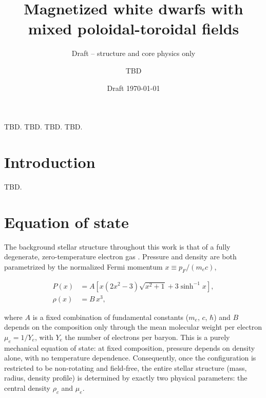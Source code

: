 \documentclass{aa}
\begin{document}
   \title{Magnetized white dwarfs with mixed poloidal-toroidal fields}

   \subtitle{Draft -- structure and core physics only}

   \author{TBD
          }


   \date{Draft \today}

   \abstract
   {TBD.}
   {TBD.}
   {TBD.}
   {TBD.}
   {}


   \maketitle


\section{Introduction}

TBD.


\section{Equation of state}
\label{sec:eos}

The background stellar structure throughout this work is that of a
fully degenerate, zero-temperature electron gas
\citep[ztwd;][]{chandrasekhar1935}. Pressure and density are both
parametrized by the normalized Fermi momentum $x \equiv p_F/(m_e c)$,

\begin{align}
P(x) &= A \left[ x(2x^2-3)\sqrt{x^2+1} + 3\sinh^{-1}x \right], \\
\rho(x) &= B\,x^3,
\end{align}

\noindent where $A$ is a fixed combination of fundamental constants
($m_e$, $c$, $\hbar$) and $B$ depends on the composition only through
the mean molecular weight per electron $\mu_e = 1/Y_e$, with $Y_e$ the
number of electrons per baryon. This is a purely mechanical equation of
state: at fixed composition, pressure depends on density alone, with no
temperature dependence. Consequently, once the configuration is
restricted to be non-rotating and field-free, the entire stellar
structure (mass, radius, density profile) is determined by exactly two
physical parameters: the central density $\rho_c$ and $\mu_e$.
\end{document}
